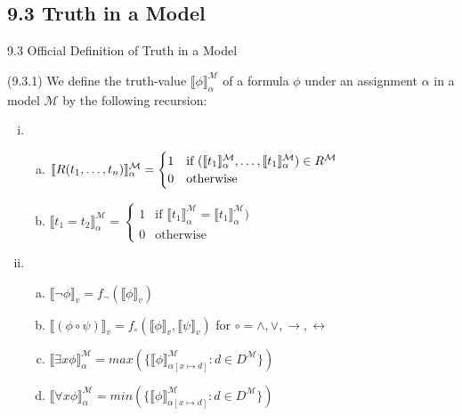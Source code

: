 \subsection{9.3 Truth in a Model}

\begin{frame}{9.3 Official Definition of Truth in a Model}

(9.3.1) We define the truth-value $\llbracket\phi\rrbracket^\mathcal{M}_\alpha$ of a formula $\phi$ under an assignment $\alpha$ in a model $\mathcal{M}$ by the following recursion:
		
		\medskip
		
		\begin{enumerate}[(i)]
		\itemsep=16pt
			
				\item	\begin{enumerate}[(a)]
						\itemsep=10pt

						\item $\llbracket R(t_1,\mathellipsis, t_n)\rrbracket_\alpha^\mathcal{M}=\begin{cases} 1 & \text{if }(\llbracket t_1\rrbracket^\mathcal{M}_\alpha,\mathellipsis, \llbracket t_1\rrbracket^\mathcal{M}_\alpha)\in R^\mathcal{M}\\0 &\text{otherwise}\end{cases}$
						\item $\llbracket t_1=t_2\rrbracket_\alpha^\mathcal{M}=\begin{cases} 1 & \text{if }\llbracket t_1\rrbracket^\mathcal{M}_\alpha=\llbracket t_1\rrbracket^\mathcal{M}_\alpha)\\0 &\text{otherwise}\end{cases}$				
						\end{enumerate}
				
				\item 	\begin{enumerate}[(a)]
						\itemsep=10pt

						\item  $\llbracket\neg \phi\rrbracket_v=f_\neg(\llbracket\phi\rrbracket_v)$
				
						\item  $\llbracket(\phi\circ \psi)\rrbracket_v=f_\circ( \llbracket\phi\rrbracket_v, \llbracket\psi\rrbracket_v)$ for $\circ=\land,\lor,\to,\leftrightarrow$
				
						\item $\llbracket\exists x\phi\rrbracket_\alpha^\mathcal{M}=max(\{\llbracket \phi\rrbracket^\mathcal{M}_{\alpha[x\mapsto d]}: d\in D^\mathcal{M}\})$
				
						\item[] $\llbracket\forall x\phi\rrbracket_\alpha^\mathcal{M}=min(\{\llbracket \phi\rrbracket^\mathcal{M}_{\alpha[x\mapsto d]}: d\in D^\mathcal{M}\})$
								
						\end{enumerate}
			
			\end{enumerate}

\end{frame}

